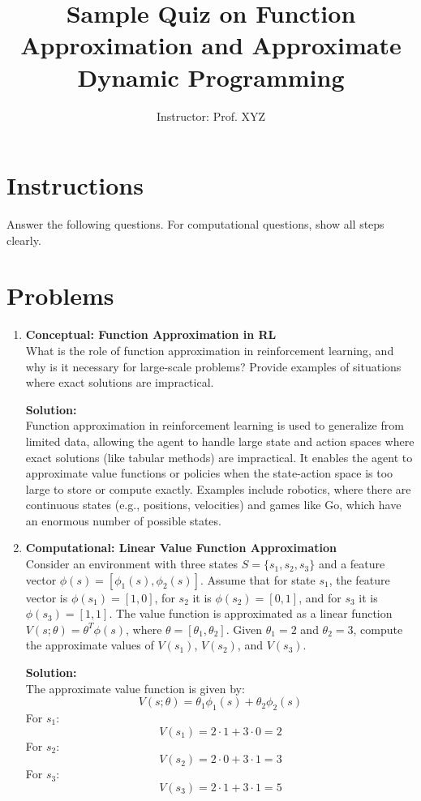 \documentclass{article}
\title{Sample Quiz on Function Approximation and Approximate Dynamic Programming}
\author{Instructor: Prof. XYZ}
\date{}
\begin{document}
\maketitle

\section*{Instructions}
Answer the following questions. For computational questions, show all steps clearly.

\section*{Problems}

\begin{enumerate}[label=Q\arabic*.]

\item \textbf{Conceptual: Function Approximation in RL} \\
What is the role of function approximation in reinforcement learning, and why is it necessary for large-scale problems? Provide examples of situations where exact solutions are impractical.

\textbf{Solution:} \\
Function approximation in reinforcement learning is used to generalize from limited data, allowing the agent to handle large state and action spaces where exact solutions (like tabular methods) are impractical. It enables the agent to approximate value functions or policies when the state-action space is too large to store or compute exactly. Examples include robotics, where there are continuous states (e.g., positions, velocities) and games like Go, which have an enormous number of possible states.

\item \textbf{Computational: Linear Value Function Approximation} \\
Consider an environment with three states $S = \{s_1, s_2, s_3\}$ and a feature vector $\phi(s) = [\phi_1(s), \phi_2(s)]$. Assume that for state $s_1$, the feature vector is $\phi(s_1) = [1, 0]$, for $s_2$ it is $\phi(s_2) = [0, 1]$, and for $s_3$ it is $\phi(s_3) = [1, 1]$. The value function is approximated as a linear function $V(s; \theta) = \theta^T \phi(s)$, where $\theta = [\theta_1, \theta_2]$. Given $\theta_1 = 2$ and $\theta_2 = 3$, compute the approximate values of $V(s_1)$, $V(s_2)$, and $V(s_3)$.

\textbf{Solution:} \\
The approximate value function is given by:
\[
V(s; \theta) = \theta_1 \phi_1(s) + \theta_2 \phi_2(s)
\]
For $s_1$: 
\[
V(s_1) = 2 \cdot 1 + 3 \cdot 0 = 2
\]
For $s_2$: 
\[
V(s_2) = 2 \cdot 0 + 3 \cdot 1 = 3
\]
For $s_3$: 
\[
V(s_3) = 2 \cdot 1 + 3 \cdot 1 = 5
\]


\end{enumerate}
\end{document}
